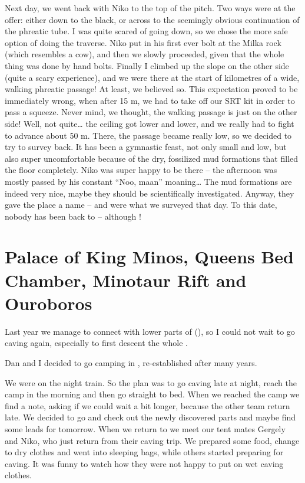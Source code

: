 Next day, we went back with Niko to the top of the pitch. Two ways were
at the offer: either down to the black, or across to the seemingly
obvious continuation of the phreatic tube. I was quite scared of going
down, so we chose the more safe option of doing the traverse. Niko put
in his first ever bolt at the Milka rock (which resembles a cow), and
then we slowly proceeded, given that the whole thing was done by hand
bolts. Finally I climbed up the slope on the other side (quite a scary
experience), and we were there at the start of kilometres of a wide,
walking phreatic passage! At least, we believed so. This expectation
proved to be immediately wrong, when after 15 m, we had to take off our
SRT kit in order to pass a squeeze. Never mind, we thought, the walking
passage is just on the other side! Well, not quite\ldots{} the ceiling
got lower and lower, and we really had to fight to advance about 50 m.
There, the passage became really low, so we decided to try to survey
back. It has been a gymnastic feast, not only small and low, but also
super uncomfortable because of the dry, fossilized mud formations that
filled the floor completely. Niko was super happy to be there -- the
afternoon was mostly passed by his constant ``Noo, maan''
moaning\ldots{} The mud formations are indeed very nice, maybe they
should be scientifically investigated. Anyway, they gave the place a
name --  and  were what we
surveyed that day. To this date, nobody has been back to  -- although !





\section{Palace of King Minos, Queens Bed Chamber, Minotaur Rift and Ouroboros}


Last year we manage to connect  with lower parts of  (), so I could not wait to go caving again, especially to first descent the whole .

Dan and I decided to go camping in , re-established after many years.

We were on the night train. So the plan was to go caving late at night,
reach the camp in the morning and then go straight to bed. When we
reached the camp we find a note, asking if we could wait a bit longer,
because the other team return late. We decided to go and check out the
newly discovered parts and maybe find some leads for tomorrow. When we
return to  we meet our tent mates Gergely and Niko, who just
return from their caving trip. We prepared some food, change to dry
clothes and went into sleeping bags, while others started preparing for
caving. It was funny to watch how they were not happy to put on wet
caving clothes.

